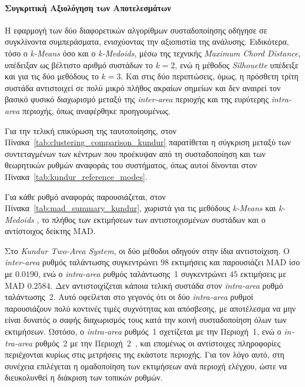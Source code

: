 \paragraph{Συγκριτική Αξιολόγηση των Αποτελεσμάτων}
Η εφαρμογή των δύο διαφορετικών αλγορίθμων συσταδοποίησης οδήγησε σε συγκλίνοντα συμπεράσματα, ενισχύοντας την αξιοπιστία της ανάλυσης. Ειδικότερα, τόσο ο \textenglish{\textit{k-Means}} όσο και ο \textenglish{\textit{k-Medoids}}, μέσω της τεχνικής \textenglish{\textit{Maximum Chord Distance}}, υπέδειξαν ως βέλτιστο αριθμό συστάδων το $k=2$, ενώ η μέθοδος \textenglish{\textit{Silhouette}} υπέδειξε και για τις δύο μεθόδους το $k=3$. Και στις δύο περιπτώσεις, όμως, η πρόσθετη τρίτη συστάδα αντιστοιχεί σε πολύ μικρό πλήθος ακραίων σημείων και δεν αναιρεί τον βασικό φυσικό διαχωρισμό μεταξύ της \textenglish{\textit{inter-area}} περιοχής και της ευρύτερης \textenglish{\textit{intra-area}} περιοχής, όπως αναφέρθηκε προηγουμένως.

Για την τελική επικύρωση της ταυτοποίησης, στον Πίνακα~\ref{tab:clustering_comparison_kundur} παρατίθεται η σύγκριση μεταξύ των συντεταγμένων των κέντρων που προέκυψαν από τη συσταδοποίηση και των θεωρητικών ρυθμών αναφοράς του συστήματος, όπως αυτοί δίνονται στον Πίνακα~\ref{tab:kundur_reference_modes}.

Για κάθε ρυθμό αναφοράς παρουσιάζεται, στον Πίνακα~\ref{tab:mad_summary_kundur}, χωριστά για τις μεθόδους \textenglish{\textit{k-Means}} και \textenglish{\textit{k-Medoids}} , το πλήθος των εκτιμήσεων των αντιστοιχισμένων συστάδων και ο αντίστοιχος δείκτης MAD.

Στο \textenglish{\textit{Kundur Two-Area System}}, οι δύο μέθοδοι οδηγούν στην ίδια αντιστοίχιση. Ο \textenglish{\textit{inter-area}} ρυθμός ταλάντωσης συγκεντρώνει $98$ εκτιμήσεις και παρουσιάζει MAD ίσο με $0.0190$, ενώ ο \textenglish{\textit{intra-area}} ρυθμός ταλάντωσης~1 συγκεντρώνει $45$ εκτιμήσεις με MAD $0.2584$. Δεν αντιστοιχίζεται κάποια τελική συστάδα στον \textenglish{\textit{intra-area}} ρυθμό ταλάντωσης~2. Αυτό οφείλεται στο γεγονός ότι οι δύο \textenglish{\textit{intra-area}} ρυθμοί παρουσιάζουν πολύ κοντινές τιμές συχνότητας και απόσβεσης, με αποτέλεσμα να μην είναι δυνατός ο σαφής διαχωρισμός τους κατά την κοινή συσταδοποίηση όλων των εκτιμήσεων. Ωστόσο, ο \textenglish{\textit{intra-area}} ρυθμός~1 σχετίζεται με την Περιοχή~1, ενώ ο \textenglish{\textit{intra-area}} ρυθμός~2 με την Περιοχή~2~\cite{estimation2021}, και επομένως οι αντίστοιχες πληροφορίες περιέχονται κυρίως στις μετρήσεις της εκάστοτε περιοχής. Για τον λόγο αυτό, στη συνέχεια επιλέγεται η ομαδοποίηση των εκτιμήσεων ανά περιοχή ελέγχου, ώστε να διευκολυνθεί η διάκριση των τοπικών ρυθμών.

